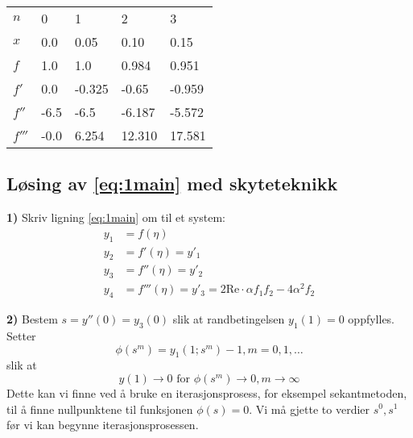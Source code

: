 \begin{table}[H]
  \centering
  \label{tab:1euler}
  \begin{tabularx}{0.7\textwidth}{XXXXX}
    \toprule
    $n$ & 0   & 1    & 2    & 3    \\
    $x$ & 0.0 & 0.05 & 0.10 & 0.15 \\
    \midrule
    $f$ & 1.0  &  1.0    &  0.984  &  0.951  \\
    $f'$ & 0.0  &  -0.325 &  -0.65  &  -0.959 \\
    $f''$ & -6.5 &  -6.5   &  -6.187 &  -5.572 \\
    $f'''$ & -0.0 &  6.254  &  12.310 &  17.581 \\
    \bottomrule
  \end{tabularx}
\end{table}

\subsection{Løsing av \eqref{eq:1main} med skyteteknikk} %
\label{sub:l_sing_av_eqr}
\textbf{1)} Skriv ligning \eqref{eq:1main} om til et system:
\begin{subequations}
\begin{align}
  y_1 &= f(\eta) \\
  y_2 &= f'(\eta) = y'_1 \\
  y_3 &= f''(\eta) = y'_2 \\
  y_4 &= f'''(\eta) = y'_3 =  2 \mathrm{Re} \cdot \alpha f_1 f_2 - 4 \alpha^2 f_2
\end{align}
\end{subequations}

\noindent \textbf{2)} Bestem $s=y''(0)=y_3(0)$ slik at randbetingelsen $y_1(1)=0$ oppfylles. Setter
\begin{equation}
  \phi(s^m) = y_1(1;s^m) - 1, m=0,1,\dots \nonumber
\end{equation}
slik at
\begin{equation}
   y(1) \rightarrow 0 \text{ for } \phi(s^m) \rightarrow 0, m \rightarrow \infty \nonumber
\end{equation}
Dette kan vi finne ved å bruke en iterasjonsprosess, for eksempel sekantmetoden, til å finne nullpunktene til funksjonen $\phi(s)=0$. Vi må gjette to verdier $s^0, s^1$ før vi kan begynne iterasjonsprosessen.



